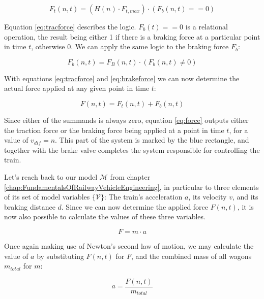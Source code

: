 \begin{equation}
\label{eq:tracforce}
F_{t}(n,t) = (H(n) \cdot F_{t,max}) \cdot (F_{b}(n,t) == 0) 
\end{equation}

\noindent
Equation \ref{eq:tracforce} describes the logic. $F_{b}(t) == 0$ is a relational operation, the result being either 1 if there is a braking force at a particular point in time $t$, otherwise 0. We can apply the same logic to the braking force $F_{b}$:

\begin{equation}
\label{eq:brakeforce}
F_{b}(n,t) = F_{B}(n,t) \cdot (F_{b}(n,t) \neq 0)
\end{equation}

\noindent
With equations \ref{eq:tracforce} and \ref{eq:brakeforce} we can now determine the actual force applied at any given point in time $t$:

\begin{equation}
\label{eq:force}
F(n,t) = F_{t}(n,t) + F_{b}(n,t) 
\end{equation} 

\noindent
Since either of the summands is always zero, equation \ref{eq:force} outputs either the traction force or the braking force being applied at a point in time $t$, for a value of $v_{dif} = n$. This part of the system is marked by the blue rectangle, and together with the brake valve completes the system responsible for controlling the train.
\par\noindent
Let's reach back to our model ${\mathcal{M}}$ from chapter \ref{chap:FundamentalsOfRailwayVehicleEngineering}, in particular to three elements of its set of model variables $\{{\mathcal{V}}\}$: The train's acceleration $a$, its velocity $v$, and its braking distance $d$. Since we can now determine the applied force $F(n,t)$, it is now also possible to calculate the values of these three variables.

\begin{equation}
\label{eq:newton}
F = m \cdot a
\end{equation}

\noindent
Once again making use of Newton's second law of motion, we may calculate the value of $a$ by substituting $F(n,t)$ for $F$, and the combined mass of all wagons $m_{total}$ for $m$:

\begin{equation}
\label{eq:acceleration}
a = \frac{F(n,t)}{m_{total}}
\end{equation}
	
